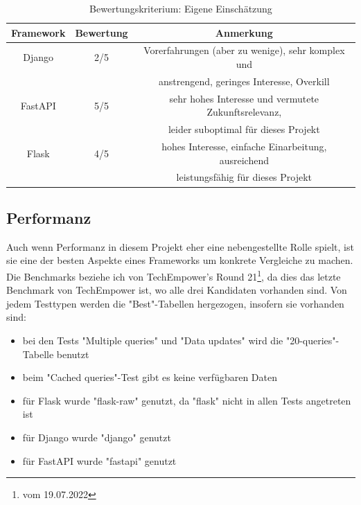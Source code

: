 \documentclass[letterpaper,11pt,leqno]{article}
\begin{document}
\begin{table}[h!]
	\begin{center}
		\begin{tabular}{|c||c|c|}
			\hline
			Framework & Bewertung & Anmerkung\\
			\hline\hline
			Django & 2/5 & Vorerfahrungen (aber zu wenige), sehr komplex und\\
			& & anstrengend, geringes Interesse, Overkill\\
			FastAPI & 5/5 & sehr hohes Interesse und vermutete Zukunftsrelevanz,\\
			& & leider suboptimal für dieses Projekt\\
			Flask & 4/5 & hohes Interesse, einfache Einarbeitung, ausreichend\\
			& & leistungsfähig für dieses Projekt\\
			\hline
		\end{tabular}
		\caption{Bewertungskriterium: Eigene Einschätzung}
	\end{center}
	\label{table:6}
\end{table}

\subsection{Performanz}
Auch wenn Performanz in diesem Projekt eher eine nebengestellte Rolle spielt, ist sie eine der besten Aspekte eines Frameworks um
konkrete Vergleiche zu machen. Die Benchmarks beziehe ich von TechEmpower's Round 21\footnote{vom 19.07.2022}, da dies das letzte
Benchmark von TechEmpower ist, wo alle drei Kandidaten vorhanden sind. Von jedem Testtypen werden die "Best"-Tabellen hergezogen,
insofern sie vorhanden sind:
\begin{itemize}
	\item bei den Tests "Multiple queries" und "Data updates" wird die "20-queries"-Tabelle benutzt
	\item beim "Cached queries"-Test gibt es keine verfügbaren Daten
	\item für Flask wurde "flask-raw" genutzt, da "flask" nicht in allen Tests angetreten ist
	\item für Django wurde "django" genutzt
	\item für FastAPI wurde "fastapi" genutzt
\end{itemize}
\clearpage
\end{document}
